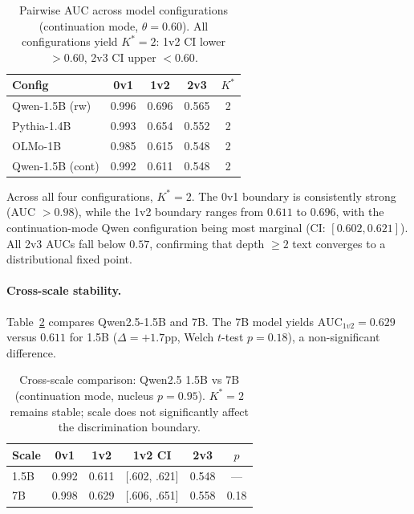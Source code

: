 \documentclass[11pt,a4paper]{article}
\newcommand{\Kstar}{K^{*}}
\newcommand{\AUC}{\mathrm{AUC}}
\begin{document}
\begin{table}[t]
\centering
\small
\caption{Pairwise AUC across model configurations (continuation mode, $\theta=0.60$). All configurations yield $\Kstar=2$: 1v2 CI lower $> 0.60$, 2v3 CI upper $< 0.60$.}
\label{tab:kstar-main}
\begin{tabular}{lcccc}
\toprule
\textbf{Config} & \textbf{0v1} & \textbf{1v2} & \textbf{2v3} & $\Kstar$ \\
\midrule
Qwen-1.5B (rw) & 0.996 & 0.696 & 0.565 & 2 \\
Pythia-1.4B & 0.993 & 0.654 & 0.552 & 2 \\
OLMo-1B & 0.985 & 0.615 & 0.548 & 2 \\
Qwen-1.5B (cont) & 0.992 & 0.611 & 0.548 & 2 \\
\bottomrule
\end{tabular}
\end{table}

Across all four configurations, $\Kstar=2$.
The 0v1 boundary is consistently strong (AUC $> 0.98$), while the 1v2 boundary ranges from $0.611$ to $0.696$, with the continuation-mode Qwen configuration being most marginal (CI: $[0.602, 0.621]$).
All 2v3 AUCs fall below $0.57$, confirming that depth $\geq 2$ text converges to a distributional fixed point.

\paragraph{Cross-scale stability.}
Table~\ref{tab:cross-scale} compares Qwen2.5-1.5B and 7B.
The 7B model yields $\AUC_{1v2} = 0.629$ versus $0.611$ for 1.5B ($\Delta = +1.7$pp, Welch $t$-test $p = 0.18$), a non-significant difference.

\begin{table}[t]
\centering
\small
\caption{Cross-scale comparison: Qwen2.5 1.5B vs 7B (continuation mode, nucleus $p=0.95$). $\Kstar=2$ remains stable; scale does not significantly affect the discrimination boundary.}
\label{tab:cross-scale}
\begin{tabular}{lccccc}
\toprule
\textbf{Scale} & \textbf{0v1} & \textbf{1v2} & \textbf{1v2 CI} & \textbf{2v3} & $p$ \\
\midrule
1.5B & 0.992 & 0.611 & [.602, .621] & 0.548 & --- \\
7B & 0.998 & 0.629 & [.606, .651] & 0.558 & 0.18 \\
\bottomrule
\end{tabular}
\end{table}
\end{document}
